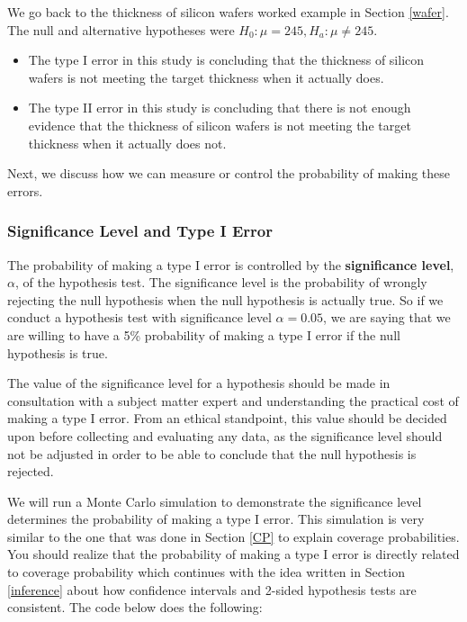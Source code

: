 \documentclass[
]{book}
\begin{document}
We go back to the thickness of silicon wafers worked example in Section \ref{wafer}. The null and alternative hypotheses were \(H_0: \mu = 245, H_a: \mu \neq 245\).

\begin{itemize}
\item
  The type I error in this study is concluding that the thickness of silicon wafers is not meeting the target thickness when it actually does.
\item
  The type II error in this study is concluding that there is not enough evidence that the thickness of silicon wafers is not meeting the target thickness when it actually does not.
\end{itemize}

Next, we discuss how we can measure or control the probability of making these errors.

\subsubsection{Significance Level and Type I Error}\label{significance-level-and-type-i-error}

The probability of making a type I error is controlled by the \textbf{significance level}, \(\alpha\), of the hypothesis test. The significance level is the probability of wrongly rejecting the null hypothesis when the null hypothesis is actually true. So if we conduct a hypothesis test with significance level \(\alpha = 0.05\), we are saying that we are willing to have a 5\% probability of making a type I error if the null hypothesis is true.

The value of the significance level for a hypothesis should be made in consultation with a subject matter expert and understanding the practical cost of making a type I error. From an ethical standpoint, this value should be decided upon before collecting and evaluating any data, as the significance level should not be adjusted in order to be able to conclude that the null hypothesis is rejected.

We will run a Monte Carlo simulation to demonstrate the significance level determines the probability of making a type I error. This simulation is very similar to the one that was done in Section \ref{CP} to explain coverage probabilities. You should realize that the probability of making a type I error is directly related to coverage probability which continues with the idea written in Section \ref{inference} about how confidence intervals and 2-sided hypothesis tests are consistent. The code below does the following:
\end{document}
